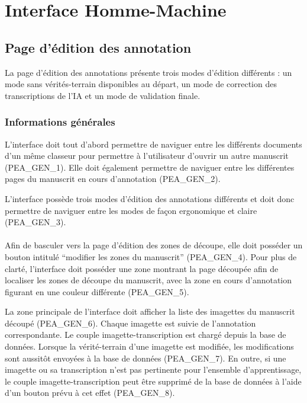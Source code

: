 \section{Interface Homme-Machine}

\subsection{Page d'édition des annotation}

La page d’édition des annotations présente trois modes d’édition différents : un mode sans vérités-terrain disponibles au départ, un mode de correction des transcriptions de l’IA et un mode de validation finale.

\subsubsection{Informations générales}

L’interface doit tout d’abord permettre de naviguer entre les différents documents d’un même classeur pour permettre à l’utilisateur d’ouvrir un autre manuscrit (PEA_GEN_1). Elle doit également permettre de naviguer entre les différentes pages du manuscrit en cours d’annotation (PEA_GEN_2).

L’interface possède trois modes d’édition des annotations différents et doit donc permettre de naviguer entre les modes de façon ergonomique et claire (PEA_GEN_3).

\paragraph{}

Afin de basculer vers la page d’édition des zones de découpe, elle doit posséder un bouton intitulé “modifier les zones du manuscrit” (PEA_GEN_4). Pour plus de clarté, l’interface doit posséder une zone montrant la page découpée afin de localiser les zones de découpe du manuscrit, avec la zone en cours d’annotation figurant en une couleur différente (PEA_GEN_5).

La zone principale de l’interface doit afficher la liste des imagettes du manuscrit découpé (PEA_GEN_6). Chaque imagette est suivie de l’annotation correspondante. Le couple imagette-transcription est chargé depuis la base de données. Lorsque la vérité-terrain d’une imagette est modifiée, les modifications sont aussitôt envoyées à la base de données (PEA_GEN_7). En outre, si une imagette ou sa transcription n’est pas pertinente pour l’ensemble d’apprentissage, le couple imagette-transcription peut être supprimé de la base de données à l’aide d’un bouton prévu à cet effet (PEA_GEN_8).

